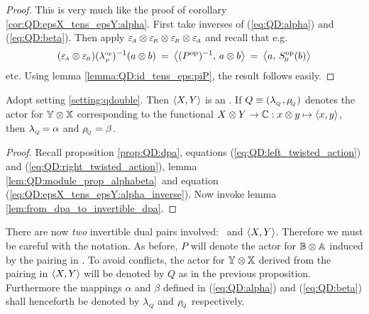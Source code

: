 \begin{proof}
This is very much like the proof of corollary \ref{cor:QD:epsX_tens_epsY:alpha}\@.
First take inverses of (\ref{eq:QD:alpha}) and (\ref{eq:QD:beta}).
Then apply $\varepsilon_{\scriptscriptstyle \! A} \otimes \varepsilon_{\scriptscriptstyle \! B} \otimes \varepsilon_{\scriptscriptstyle \! B} \otimes \varepsilon_{\scriptscriptstyle \! A}$ and recall that e.g.\
$$ (\epsA \tens \epsB)(\lpop)^{-1}(a \tens b)
       \:=\:  \pairM{(P\op)^{-1}}{a \tens b}
       \:=\:  \pairM{a}{\SB\op(b)} $$
etc. Using lemma \ref{lemma:QD:id_tens_eps:piP}, the result follows easily.
\end{proof}


\begin{prop} \label{prop:qdouble_is_idpa}
Adopt setting \ref{setting:qdouble}\@. Then\/ $\langle X,Y \rangle$ is an \idpa\@.
If\/ $Q\equiv(\lambda_{_Q\!}\, ,\rho_{_{\!Q}})$ denotes the actor for\/ $\mathbb{Y} \otimes \mathbb{X}$
corresponding to the functional\/ $X \otimes Y \rightarrow \mathbb{C} : x \otimes y \mapsto \langle x,y \rangle$,
then\/ $\lambda_{_Q\!}=\alpha$ and\/ $\rho_{_{\!Q}}=\beta$.
\end{prop}

\begin{proof}
Recall proposition \ref{prop:QD:dpa},
equations (\ref{eq:QD:left_twisted_action}) and (\ref{eq:QD:right_twisted_action}),
lemma \ref{lem:QD:module_prop_alphabeta}\ and equation
(\ref{eq:QD:epsX_tens_epsY:alpha_inverse}).
Now invoke lemma  \ref{lem:from_dpa_to_invertible_dpa}\@.
\end{proof}


\begin{notation}\label{not:QD:pairing:Q} \rm
There are now {\em two\/} invertible dual pairs involved: \pairAB\ and $\langle X,Y \rangle$.
Therefore we must be careful with the notation. As before, $P$ will denote the
actor for $\mathbb{B} \otimes \mathbb{A}$ induced by the pairing in \pairAB\@.
To avoid conflicts, the actor for $\mathbb{Y} \otimes \mathbb{X}$ derived from the pairing in $\langle X,Y \rangle$
will be denoted by $Q$ as in the previous proposition.
Furthermore the mappings $\alpha$ and $\beta$ defined in (\ref{eq:QD:alpha})
and (\ref{eq:QD:beta}) shall henceforth be denoted by $\lambda_{_Q\!}$ and $\rho_{_{\!Q}}$ respectively.
\end{notation}
